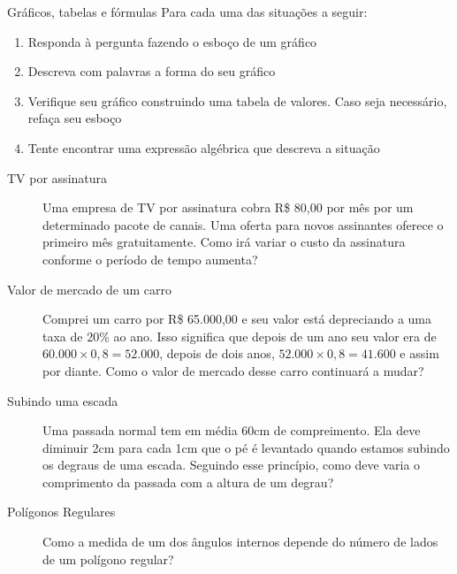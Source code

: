\begin{task}{Gráficos, tabelas e fórmulas}
Para cada uma das situações a seguir:
\begin{enumerate}
\item Responda à pergunta fazendo o esboço de um gráfico
\item Descreva com palavras a forma do seu gráfico
\item Verifique seu gráfico construindo uma tabela de valores. Caso seja necessário, refaça seu esboço
\item Tente encontrar uma expressão algébrica que descreva a situação
\end{enumerate}

\begin{description}\item[TV por assinatura]
Uma empresa de TV por assinatura cobra R\$ 80,00 por mês por um determinado pacote de canais. Uma oferta para novos assinantes oferece o primeiro mês gratuitamente. Como irá variar o custo da assinatura conforme o período de tempo aumenta?
\item[Valor de mercado de um carro]
Comprei um carro por R\$ 65.000,00 e seu valor está depreciando a uma taxa de 20\% ao ano. Isso significa que depois de um ano seu valor era de $60.000\times 0,8=52.000$, depois de dois anos, $52.000\times 0,8=41.600$ e assim por diante. Como o valor de mercado desse carro continuará a mudar?
\item[Subindo uma escada]
Uma passada normal tem em média 60cm de compreimento. Ela deve diminuir 2cm para cada 1cm que o pé é levantado quando estamos subindo os degraus de uma escada. Seguindo esse princípio, como deve varia o comprimento da passada com a altura de um degrau?
\item[Polígonos Regulares]
Como a medida de um dos ângulos internos depende do número de lados de um polígono regular?
\end{description}

\setlength{\columnsep}{0pt}
\begin{multicols}{8}


\end{multicols}
\end{task}
